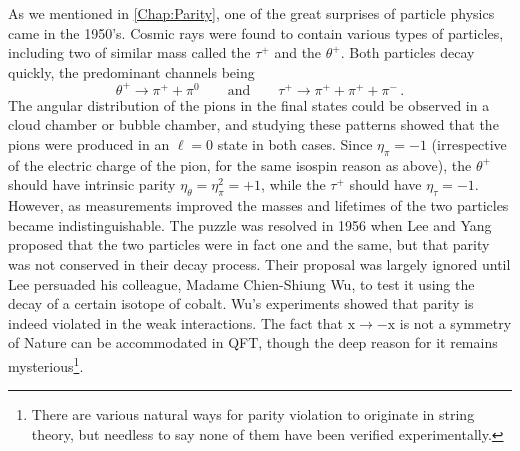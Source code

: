 \documentclass{article}
\theoremstyle{plain}\theoremheaderfont{\normalfont\itshape}\theorembodyfont{\rmfamily}\theoremseparator{.}\newtheorem*{rem}{Remark}\newtheorem*{ex}{Example}\newtheorem*{proof}{Proof}\newtheorem*{altp}{Alternative proof}
\theoremstyle{plain}\theoremheaderfont{\normalfont\bfseries}\theorembodyfont{\rmfamily}\theoremseparator{.}\newtheorem{thm}{Theorem}[section]\newtheorem{lem}[thm]{Lemma}\newtheorem{prop}[thm]{Proposition}\newtheorem*{cor}{Corollary}\newtheorem{defn}[thm]{Definition}\newtheorem{clm}[thm]{Claim}\newtheorem{clminproof}{Claim}
\theoremstyle{break}\theoremheaderfont{\normalfont\itshape}\theorembodyfont{\rmfamily}\theoremseparator{.\medskip}\newtheorem*{proofskip}{Proof}\newtheorem*{exs}{Examples}\newtheorem*{rems}{Remarks}
\theoremstyle{break}\theoremheaderfont{\normalfont\bfseries}\theorembodyfont{\rmfamily}\theoremseparator{.\medskip}\newtheorem{lemskip}[thm]{Lemma}\newtheorem{defnskip}[thm]{Definition}\newtheorem{propskip}[thm]{Proposition}\newtheorem{thmskip}[thm]{Theorem}
\numberwithin{equation}{section}
\newcommand{\vb}[1]{\bm{\mathrm{#1}}}
\begin{document}
    As we mentioned in \cref{Chap:Parity}, one of the great surprises of particle physics came in the 1950's. Cosmic rays were found to contain various types of particles, including two of similar mass called the \(\tau^+\) and the \(\theta^+\). Both particles decay quickly, the predominant channels being
    \begin{equation}
        \theta^+\longrightarrow\pi^+ +\pi^0\qquad\text{and}\qquad\tau^+\longrightarrow\pi^+ +\pi^+ +\pi^-\,.
    \end{equation}
    The angular distribution of the pions in the final states could be observed in a cloud chamber or bubble chamber, and studying these patterns showed that the pions were produced in an \(\ell=0\) state in both cases. Since \(\eta_\pi=-1\) (irrespective of the electric charge of the pion, for the same isospin reason as above), the \(\theta^+\) should have intrinsic parity \(\eta_\theta=\eta_\pi^2=+1\), while the \(\tau^+\) should have \(\eta_\tau=-1\). However, as measurements improved the masses and lifetimes of the two particles became indistinguishable. The puzzle was resolved in 1956 when Lee and Yang proposed that the two particles were in fact one and the same, but that parity was not conserved in their decay process. Their proposal was largely ignored until Lee persuaded his colleague, Madame Chien-Shiung Wu, to test it using the decay of a certain isotope of cobalt. Wu's experiments showed that parity is indeed violated in the weak interactions. The fact that \(\vb{x}\to -\vb{x}\) is not a symmetry of Nature can be accommodated in QFT, though the deep reason for it remains mysterious\footnote{There are various natural ways for parity violation to originate in string theory, but needless to say none of them have been verified experimentally.}.

    \newpage
\end{document}
